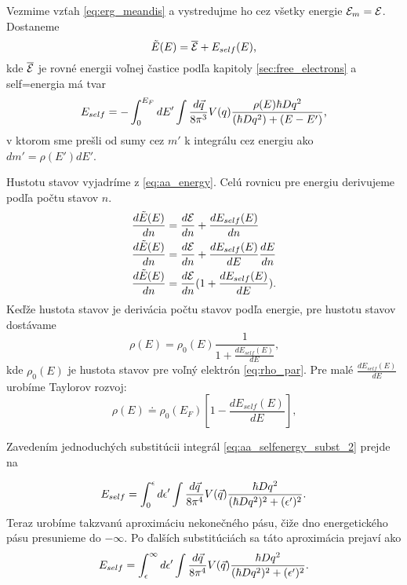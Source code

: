 Vezmime vzťah \eqref{eq:erg_meandis} a vystredujme ho cez všetky energie $\mathcal{E}_m = \mathcal{E}$. Dostaneme
\begin{equation}
 \label{eq:aa_energy}
 \tilde E(E)=\overline{\mathcal{E}}+E_{self}(E)\text{,}
\end{equation}
kde $\overline{\mathcal{E}}$ je rovné energii voľnej častice podľa kapitoly \ref{sec:free_electrons} a self=energia má tvar
\begin{equation}
 \label{eq:aa_self_energy}
 E_{self}=-\int_{0}^{E_F}dE' \int \frac{d\vec{q}}{8\pi^3}V(q)\frac{\rho(E)\hbar D q^2}{(\hbar D q^2)+(E-E')}\text{,}
\end{equation}
v ktorom sme prešli od sumy cez $m'$ k integrálu cez energiu ako $dm'=\rho(E')dE'$.

Hustotu stavov vyjadríme z \eqref{eq:aa_energy}. Celú rovnicu pre energiu derivujeme podľa počtu stavov $n$.
\begin{align}
  \frac{d\tilde E(E)}{dn}&=\frac{d\mathcal{E}}{dn}+\frac{dE_{self}(E)}{dn}\\ \notag
  \frac{d\tilde E(E)}{dn}&=\frac{d\mathcal{E}}{dn}+\frac{dE_{self}(E)}{dE}\frac{dE}{dn}\\ \notag
  \label{eq:aa_dos_invert}
  \frac{d\tilde E(E)}{dn}&=\frac{d\mathcal{E}}{dn}(1+\frac{dE_{self}(E)}{dE}) \text{.}
\end{align}
Keďže hustota stavov je derivácia počtu stavov podľa energie, pre hustotu stavov dostávame
\begin{equation}
 \label{eq:aa_dos1}
 \rho(E)=\rho_0(E)\frac{1}{1+\frac{dE_{self}(E)}{dE}} \text{,}
 \end{equation}
 kde $\rho_0(E)$ je hustota stavov pre voľný elektrón \eqref{eq:rho_par}.
 Pre malé $\frac{dE_{self}(E)}{dE}$ urobíme Taylorov rozvoj:
\begin{equation}
 \label{eq:aa_dos2}
 \rho(E)\doteq\rho_0(E_F)[1-\frac{dE_{self}(E)}{dE}]\text{,}
\end{equation}



Zavedením jednoduchých substitúcii integrál \eqref{eq:aa_selfenergy_subst_2} prejde na

\begin{equation}
\label{eq:aa_selfenergy_subst_2}
E_{self}=\int_{0}^{\epsilon}d\epsilon' \int \frac{d\vec{q}}{8\pi^4}V(\vec{q})\frac{\hbar D q^2}{(\hbar Dq^2)^2+(\epsilon')^2}\text{.}
\end{equation}
Teraz urobíme takzvanú aproximáciu nekonečného pásu, čiže dno energetického pásu presunieme do $-\infty$.
Po ďalších substitúciách sa táto aproximácia prejaví ako
\begin{equation}
\label{eq:aa_selfenergy_infinite}
E_{self}=\int_{\epsilon}^{\infty}d\epsilon' \int \frac{d\vec{q}}{8\pi^4}V(\vec{q})\frac{\hbar D q^2}{(\hbar Dq^2)^2+(\epsilon')^2}\text{.}
\end{equation}


